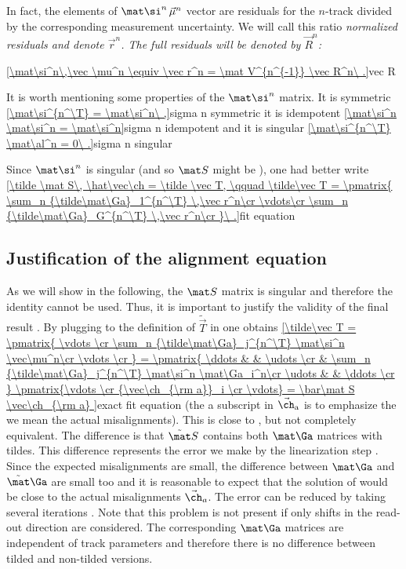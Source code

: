 In fact, the elements of $\mat\si^n\,\vec \mu^n$ vector are residuals for the $n$-track divided by the corresponding measurement uncertainty. We will call this ratio \em{normalized} residuals and denote $\vec r^n$. The full residuals will be denoted by $\vec R^n$:

\eqref{\mat\si^n\,\vec \mu^n \equiv \vec r^n = \mat V^{n^{-1}} \vec R^n\ .}{vec R}

It is worth mentioning some properties of the $\mat\si^n$ matrix. It is symmetric
\eqref{\mat\si^{n^\T} = \mat\si^n\ ,}{sigma n symmetric}
it is idempotent
\eqref{\mat\si^n \mat\si^n = \mat\si^n}{sigma n idempotent}
and it is singular
\eqref{\mat\si^{n^\T} \mat\al^n = 0\ .}{sigma n singular}

Since $\mat\si^n$ is singular (and so $\mat S$ might be ), one had better write
\eqref{\tilde \mat S\, \hat\vec\ch = \tilde \vec T, \qquad 
\tilde\vec T = \pmatrix{
\sum_n {\tilde\mat\Ga}_1^{n^\T} \,\vec r^n\cr
\vdots\cr
\sum_n {\tilde\mat\Ga}_G^{n^\T} \,\vec r^n\cr
}\ .}{fit equation}



\subsection[fit equation]{Justification of the alignment equation}

As we will show in the following, the $\mat S$ matrix is singular and therefore the identity  cannot be used. Thus, it is important to justify the validity of the final result . By plugging  to the definition of $\tilde\vec T$ in  one obtains
\eqref{\tilde\vec T =
\pmatrix{
\vdots \cr
\sum_n {\tilde\mat\Ga}_j^{n^\T} \mat\si^n \vec\mu^n\cr
\vdots \cr
}
=
\pmatrix{
\ddots & & \udots \cr
 & \sum_n {\tilde\mat\Ga}_j^{n^\T} \mat\si^n \mat\Ga_i^n\cr
\udots & & \ddots \cr
}
\pmatrix{\vdots \cr {\vec\ch_{\rm a}}_i \cr \vdots}
=
\bar\mat S \vec\ch_{\rm a}
}{exact fit equation}
(the a subscript in $\vec\ch_{\rm a}$ is to emphasize the we mean the actual misalignments). This is close to , but not completely equivalent. The difference is that $\tilde\mat S$ contains both $\mat\Ga$ matrices with tildes. This difference represents the error we make by the linearization step . Since the expected misalignments are small, the difference between $\mat\Ga$ and $\tilde\mat\Ga$ are small too and it is reasonable to expect that the solution of  would be close to the actual misalignments $\vec\ch_a$. The error can be reduced by taking several iterations . Note that this problem is not present if only shifts in the read-out direction are considered. The corresponding $\mat\Ga$ matrices are independent of track parameters and therefore there is no difference between tilded and non-tilded versions.


